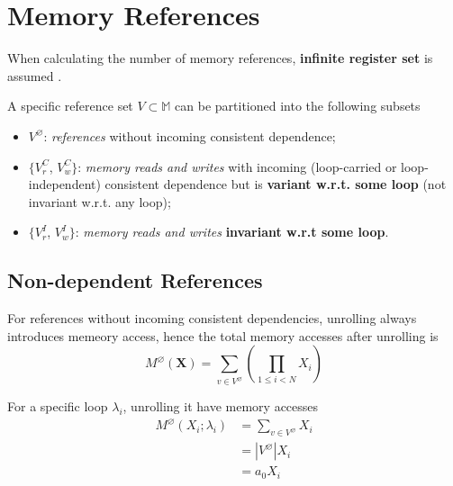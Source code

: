 \section{Memory References}
When calculating the number of memory references, \textbf{infinite register set}
is assumed \cite{carrKennedy1994}.

A specific reference set $V \subset \mathbb{M}$ can be partitioned into the
following subsets
\begin{itemize}
  \item $V^{\varnothing}$: \textit{references} without incoming consistent dependence;
  \item $\{V^{C}_r$, $V^{C}_w\}$\footnotemark[\value{footnote}]: 
    \textit{memory reads and writes} with  incoming 
    (loop-carried or loop-independent) consistent dependence 
    but is \textbf{variant w.r.t. some loop} (not invariant w.r.t. any loop);
  \item $\{V^{I}_{r}$, $V^{I}_w\}$\footnotemark[\value{footnote}]: 
    \textit{memory reads and writes} \textbf{invariant w.r.t some loop}.
\end{itemize}

\subsection{Non-dependent References}
For references without incoming consistent dependencies, unrolling always
introduces memeory access, hence the total memory accesses after unrolling is
\begin{equation}
  M^{\varnothing}(\mathbf{X}) = \sum_{v \in V^{\varnothing}}
  \left(\prod_{1 \le i < N} X_{i} \right)
\end{equation}

For a specific loop $\lambda_{i}$, unrolling it have memory accesses
\begin{equation}
  \begin{aligned}
    M^{\varnothing}(X_{i}; \lambda_{i}) &= \sum_{v \in V^{\varnothing}} X_{i} \\
    &= \left| V^{\varnothing} \right| X_{i} \\
    &= a_{0} X_{i}
  \end{aligned}
\end{equation}

